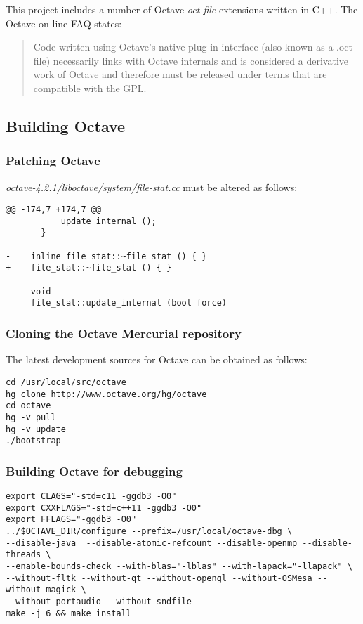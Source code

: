 \documentclass[a4paper,twoside,10pt,english]{report}
\begin{document}
This project includes a number of Octave \emph{oct-file} extensions written in
C++. The Octave on-line FAQ states:
\begin{quote}
  Code written using Octave's native plug-in interface (also known as a .oct
  file) necessarily links with Octave internals and is considered a derivative
  work of Octave and therefore must be released under terms that are
  compatible with the GPL.
\end{quote}

\subsection*{Building Octave}
\subsubsection*{Patching Octave}
\emph{octave-4.2.1/liboctave/system/file-stat.cc} must be altered as follows:
\begin{small}
\begin{verbatim}
@@ -174,7 +174,7 @@
           update_internal ();
       }
 
-    inline file_stat::~file_stat () { }
+    file_stat::~file_stat () { }
 
     void
     file_stat::update_internal (bool force)
\end{verbatim}
\end{small}

\subsubsection*{Cloning the Octave Mercurial repository}
The latest development sources for Octave can be obtained as follows:
\begin{small}
\begin{verbatim}
cd /usr/local/src/octave
hg clone http://www.octave.org/hg/octave
cd octave
hg -v pull
hg -v update
./bootstrap
\end{verbatim}
\end{small}
\subsubsection*{Building Octave for debugging}
\begin{small}
\begin{verbatim}
export CLAGS="-std=c11 -ggdb3 -O0"
export CXXFLAGS="-std=c++11 -ggdb3 -O0"
export FFLAGS="-ggdb3 -O0"
../$OCTAVE_DIR/configure --prefix=/usr/local/octave-dbg \
--disable-java  --disable-atomic-refcount --disable-openmp --disable-threads \
--enable-bounds-check --with-blas="-lblas" --with-lapack="-llapack" \
--without-fltk --without-qt --without-opengl --without-OSMesa --without-magick \
--without-portaudio --without-sndfile
make -j 6 && make install
\end{verbatim}
\end{small}
\end{document}
